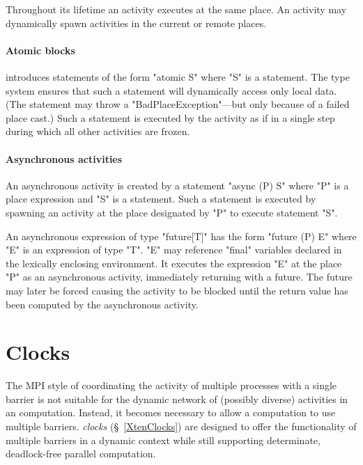 Throughout its lifetime an activity executes at the same place. An
activity may dynamically spawn activities in the current or remote
places.

\paragraph{Atomic blocks}

\Xten{} introduces statements of the form \xcd"atomic S" where \xcd"S"
is a statement.  The type system ensures that such a statement will
dynamically access only local data. (The statement may throw
a \xcd"BadPlaceException"---but only because of a failed place cast.)
Such a statement is executed by the activity as if in a single step
during which all other activities are frozen.

\paragraph{Asynchronous activities}

An asynchronous activity is created by a statement \xcd"async (P) S"
where \xcd"P" is a place expression and \xcd"S" is a statement.  Such
a statement is executed by spawning an activity at the place
designated by \xcd"P" to execute statement \xcd"S".

An asynchronous expression of type \xcd"future[T]" has the form
\xcd"future (P) E" where \xcd"E" is an expression of type \xcd"T".  \xcd"E"
may reference \xcd"final" variables declared in the lexically
enclosing environment.  It executes the expression \xcd"E" at the
place \xcd"P" as an asynchronous activity, immediately returning with
a future. The future may later be forced causing the activity to be
blocked until the return value has been computed by the asynchronous
activity.

\section{Clocks}
The MPI style of coordinating the activity of multiple processes with
a single barrier is not suitable for the dynamic network of (possibly
diverse) activities in an \Xten{} computation. Instead, it becomes
necessary to allow a computation to use multiple barriers. \Xten{}
\emph{clocks} (\S~\ref{XtenClocks}) are designed to offer the
functionality of multiple barriers in a dynamic context while still
supporting determinate, deadlock-free parallel computation.

